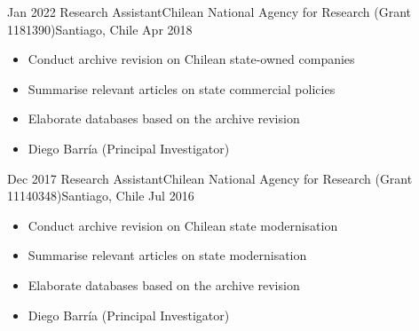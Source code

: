 
\begin{experiences}
  \emptySeparator 
  \experience 
    {Jan 2022} {Research Assistant}{Chilean National Agency for Research (Grant 1181390)}{Santiago, Chile} {Apr 2018}
    {\begin{itemize}
    \item Conduct archive revision on Chilean state-owned companies
    \item Summarise relevant articles on state commercial policies
    \item Elaborate databases based on the archive revision
    \item Diego Barría {\small (Principal Investigator)}
    \end{itemize}}
    {}
\end{experiences}
\vspace{-2mm}

\begin{experiences}
  \emptySeparator 
  \experience 
    {Dec 2017} {Research Assistant}{Chilean National Agency for Research (Grant 11140348)}{Santiago, Chile} {Jul 2016}
    {\begin{itemize}
    \item Conduct archive revision on Chilean state modernisation
    \item Summarise relevant articles on state modernisation
    \item Elaborate databases based on the archive revision
    \item Diego Barría {\small (Principal Investigator)}
    \end{itemize}}
    {}
\end{experiences}
\vspace{-2mm}

